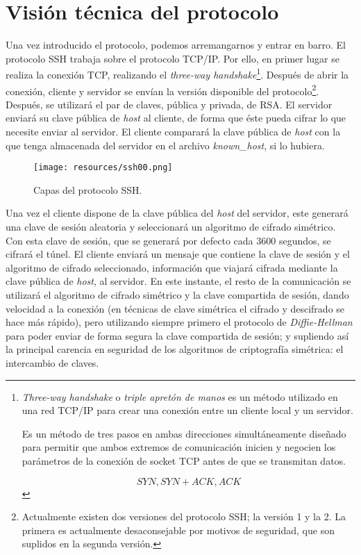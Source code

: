 \documentclass[a4paper, 11pt, titlepage]{article}
\begin{document}
\section{Visión técnica del protocolo}

    Una vez introducido el protocolo, podemos arremangarnos y entrar en barro. El protocolo 
    SSH trabaja sobre el protocolo TCP/IP. Por ello, en primer lugar se realiza la conexión 
    TCP, realizando el \textit{three-way handshake}\footnote{
        \textit{Three-way handshake} o \textit{triple apretón de manos} es un método 
        utilizado en una red TCP/IP para crear una conexión entre un cliente local y 
        un servidor.

        Es un método de tres pasos en ambas direcciones simultáneamente diseñado para 
        permitir que ambos extremos de comunicación inicien y negocien los parámetros 
        de la conexión de socket TCP antes de que se transmitan datos.

        \[SYN, SYN+ACK, ACK\]
    }. Después de abrir la conexión, cliente y servidor se envían la versión disponible 
    del protocolo\footnote{ \label{versiones}
        Actualmente existen dos versiones del protocolo SSH; la versión 1 y la 2. La primera 
        es actualmente desaconsejable por motivos de seguridad, que son suplidos en la segunda 
        versión.
    }. Después, se utilizará el par de claves, pública y privada, de RSA. El servidor enviará 
    su clave pública de \textit{host} al cliente, de forma que éste pueda cifrar lo que necesite 
    enviar al servidor. El cliente comparará la clave pública de \textit{host} con la que 
    tenga almacenada del servidor en el archivo \textit{known\_host}, si lo hubiera. 

    \begin{figure}[htp]
        \centering
        \texttt{[image: resources/ssh00.png]}
        \caption{Capas del protocolo SSH.}
        \label{ssh00}
    \end{figure}

    Una vez el cliente dispone de la clave pública del \textit{host} del servidor, este 
    generará una clave de sesión aleatoria y seleccionará un algoritmo de cifrado simétrico.
    Con esta clave de sesión, que se generará por defecto cada 3600 segundos, se cifrará el 
    túnel. El cliente enviará un mensaje que contiene la clave de sesión y el algoritmo de 
    cifrado seleccionado, información que viajará cifrada mediante la clave pública de \textit{host},
    al servidor. En este instante, el resto de la comunicación se utilizará el algoritmo de 
    cifrado simétrico y la clave compartida de sesión, dando velocidad a la conexión (en técnicas 
    de clave simétrica el cifrado y descifrado se hace más rápido), pero utilizando siempre 
    primero el protocolo de \textit{Diffie-Hellman} para poder enviar de forma segura 
    la clave compartida de sesión; y supliendo así la principal carencia en seguridad de los algoritmos 
    de criptografía simétrica: el intercambio de claves.
\end{document}
